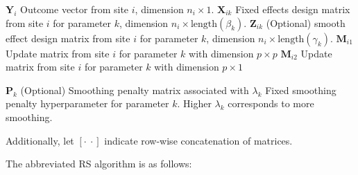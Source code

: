 \documentclass[
  12pt,
]{article}
\begin{document}
\(\boldsymbol{Y}_i\) Outcome vector from site \(i\), dimension \(n_i \times 1\).
\(\boldsymbol{X}_{ik}\) Fixed effects design matrix from site \(i\) for parameter \(k\), dimension \(n_i \times \text{length}(\beta_k)\).
\(\boldsymbol{Z}_{ik}\) (Optional) smooth effect design matrix from site \(i\) for parameter \(k\), dimension \(n_i \times \text{length}(\gamma_k)\).
\(\boldsymbol{M}_{i1}\) Update matrix from site \(i\) for parameter \(k\) with dimension \(p \times p\)
\(\boldsymbol{M}_{i2}\) Update matrix from site \(i\) for parameter \(k\) with dimension \(p \times 1\)

\(\boldsymbol{P}_{k}\) (Optional) Smoothing penalty matrix associated with
\(\lambda_k\) Fixed smoothing penalty hyperparameter for parameter \(k\). Higher \(\lambda_k\) corresponds to more smoothing.

Additionally, let \([\cdot \: \cdot]\) indicate row-wise concatenation of matrices.

The abbreviated RS algorithm is as follows:
\end{document}
